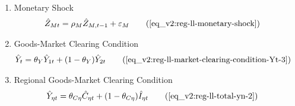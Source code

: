 \documentclass[../thesis.tex]{subfiles}
\begin{document}
{\begin{itemize}
\begin{enumerate}
			\item Monetary Shock
			\begin{alignat}{2}
				\hat{Z}_{Mt} &= \rho_M \hat{Z}_{M,t-1} + \varepsilon_{M} \tag{\ref{eq_v2:reg-ll-monetary-shock}}
			\end{alignat}
			
			\item Goods-Market Clearing Condition
			\begin{align}
				\hat{Y}_{t} &= \theta_{Y} \hat{Y}_{1t} + (1-\theta_{Y}) \hat{Y}_{2t} \tag{\ref{eq_v2:reg-ll-market-clearing-condition-Yt-3}}
			\end{align}
			
			\item Regional Goods-Market Clearing Condition
			\begin{align}
				\hat{Y}_{\eta t} &= \theta_{C\eta} \hat{C}_{\eta t} + (1 - \theta_{C\eta}) \hat{I}_{\eta t} \tag{\ref{eq_v2:reg-ll-total-yn-2}}
			\end{align}
			
		\end{enumerate}
		
	\end{itemize}
	
} %



\newpage
\end{document}
